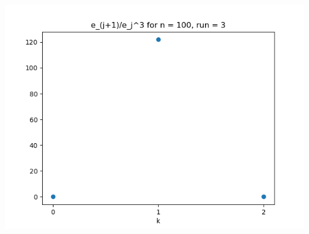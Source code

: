 \documentclass{article}
\begin{document}
\begin{enumerate}
\begin{enumerate}
\begin{center}
			\includegraphics[scale=.4]{hw4 err n = 100 run = 3}
			

\end{center}
\end{enumerate}
\end{enumerate}
\end{document}
